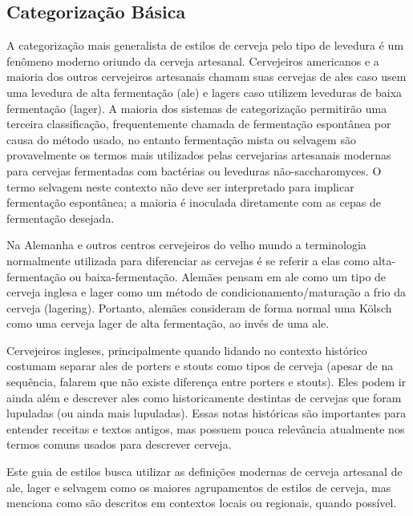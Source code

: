 \subsection*{Categorização Básica}

A categorização mais generalista de estilos de cerveja pelo tipo de levedura é um fenômeno moderno oriundo da cerveja artesanal. Cervejeiros americanos e a maioria dos outros cervejeiros artesanais chamam suas cervejas de ales caso usem uma levedura de alta fermentação (ale) e lagers caso utilizem leveduras de baixa fermentação (lager). A maioria dos sistemas de categorização permitirão uma terceira classificação, frequentemente chamada de fermentação espontânea por causa do método usado, no entanto fermentação mista ou selvagem são provavelmente os termos mais utilizados pelas cervejarias artesanais modernas para cervejas fermentadas com bactérias ou leveduras não-saccharomyces. O termo selvagem neste contexto não deve ser interpretado para implicar fermentação espontânea; a maioria é inoculada diretamente com as cepas de fermentação desejada.

Na Alemanha e outros centros cervejeiros do velho mundo a terminologia normalmente utilizada para diferenciar as cervejas é se referir a elas como alta-fermentação ou baixa-fermentação. Alemães pensam em ale como um tipo de cerveja inglesa e lager como um método de condicionamento/maturação a frio da cerveja (lagering). Portanto, alemães consideram de forma normal uma Kölsch como uma cerveja lager de alta fermentação, ao invés de uma ale.

Cervejeiros ingleses, principalmente quando lidando no contexto histórico costumam separar ales de porters e stouts como tipos de cerveja (apesar de na sequência, falarem que não existe diferença entre porters e stouts). Eles podem ir ainda além e descrever ales como historicamente destintas de cervejas que foram lupuladas (ou ainda mais lupuladas). Essas notas históricas são importantes para entender receitas e textos antigos, mas possuem pouca relevância atualmente nos termos comuns usados para descrever cerveja.

Este guia de estilos busca utilizar as definições modernas de cerveja artesanal de ale, lager e selvagem como os maiores agrupamentos de estilos de cerveja, mas menciona como são descritos em contextos locais ou regionais, quando possível.